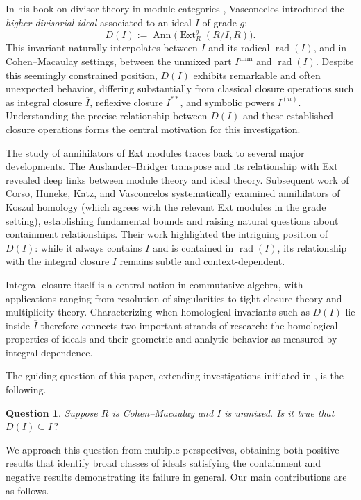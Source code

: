 \documentclass[11pt,a4paper]{amsart}
\numberwithin{equation}{section}
\newtheorem{question}[theorem]{Question}
\DeclareMathOperator{\Ann}{Ann}\DeclareMathOperator{\ann}{Ann}
\DeclareMathOperator{\unm}{unm}
\DeclareMathOperator{\rad}{rad}
\DeclareMathOperator{\Ext}{Ext}
\begin{document}
In his book on divisor theory in module categories \cite{wol}, Vasconcelos introduced the \emph{higher divisorial ideal} associated to an ideal \(I\) of grade \(g\):
\[
D(I) := \Ann\!\bigl(\Ext^g_R(R/I,R)\bigr).
\]
This invariant naturally interpolates between \(I\) and its radical \(\rad(I)\), and in Cohen–Macaulay settings, between the unmixed part \(I^{\unm}\) and \(\rad(I)\). Despite this seemingly constrained position, \(D(I)\) exhibits remarkable and often unexpected behavior, differing substantially from classical closure operations such as integral closure \(\overline{I}\), reflexive closure \(I^{**}\), and symbolic powers \(I^{(n)}\). Understanding the precise relationship between \(D(I)\) and these established closure operations forms the central motivation for this investigation.

The study of annihilators of Ext modules traces back to several major developments. The Auslander–Bridger transpose and its relationship with Ext revealed deep links between module theory and ideal theory. Subsequent work of Corso, Huneke, Katz, and Vasconcelos \cite{corso} systematically examined annihilators of Koszul homology (which agrees with the relevant Ext modules in the grade setting), establishing fundamental bounds and raising natural questions about containment relationships. Their work highlighted the intriguing position of \(D(I)\): while it always contains \(I\) and is contained in \(\rad(I)\), its relationship with the integral closure \(\overline{I}\) remains subtle and context-dependent.

Integral closure itself is a central notion in commutative algebra, with applications ranging from resolution of singularities to tight closure theory and multiplicity theory. Characterizing when homological invariants such as \(D(I)\) lie inside \(\overline{I}\) therefore connects two important strands of research: the homological properties of ideals and their geometric and analytic behavior as measured by integral dependence.

The guiding question of this paper, extending investigations initiated in \cite{corso}, is the following.

\begin{question}\label{1.1}
	Suppose \(R\) is Cohen–Macaulay and \(I\) is unmixed. Is it true that
	\(
	D(I) \subseteq \overline{I}\, ?
	\)
\end{question}

We approach this question from multiple perspectives, obtaining both positive results that identify broad classes of ideals satisfying the containment and negative results demonstrating its failure in general. Our main contributions are as follows.
\end{document}
